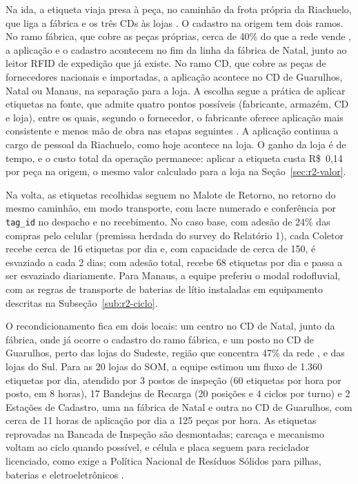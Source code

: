 Na ida, a etiqueta viaja presa à peça, no caminhão da frota própria da Riachuelo, que liga a fábrica e os três CDs às lojas \cite{bloomberglinea2026riachuelo,exame2025bolsa,folhape2023guararapes}. O cadastro na origem tem dois ramos. No ramo fábrica, que cobre as peças próprias, cerca de 40\% do que a rede vende \cite{bloomberglinea2026riachuelo}, a aplicação e o cadastro acontecem no fim da linha da fábrica de Natal, junto ao leitor RFID de expedição que já existe. No ramo CD, que cobre as peças de fornecedores nacionais e importadas, a aplicação acontece no CD de Guarulhos, Natal ou Manaus, na separação para a loja. A escolha segue a prática de aplicar etiquetas na fonte, que admite quatro pontos possíveis (fabricante, armazém, CD e loja), entre os quais, segundo o fornecedor, o fabricante oferece aplicação mais consistente e menos mão de obra nas etapas seguintes \cite{sensormatic2025sourcetagging}. A aplicação continua a cargo de pessoal da Riachuelo, como hoje acontece na loja. O ganho da loja é de tempo, e o custo total da operação permanece: aplicar a etiqueta custa R\$~0,14 por peça na origem, o mesmo valor calculado para a loja na Seção~\ref{sec:r2-valor}.

Na volta, as etiquetas recolhidas seguem no Malote de Retorno, no retorno do mesmo caminhão, em modo transporte, com lacre numerado e conferência por \texttt{tag\_id} no despacho e no recebimento. No caso base, com adesão de 24\% das compras pelo celular (premissa herdada do survey do Relatório 1), cada Coletor recebe cerca de 16 etiquetas por dia e, com capacidade de cerca de 150, é esvaziado a cada 2 dias; com adesão total, recebe 68 etiquetas por dia e passa a ser esvaziado diariamente. Para Manaus, a equipe preferiu o modal rodofluvial, com as regras de transporte de baterias de lítio instaladas em equipamento descritas na Subseção~\ref{sub:r2-ciclo}.

O recondicionamento fica em dois locais: um centro no CD de Natal, junto da fábrica, onde já ocorre o cadastro do ramo fábrica, e um posto no CD de Guarulhos, perto das lojas do Sudeste, região que concentra 47\% da rede \cite{btg2025guararapes}, e das lojas do Sul. Para as 20 lojas do SOM, a equipe estimou um fluxo de 1.360 etiquetas por dia, atendido por 3 postos de inspeção (60 etiquetas por hora por posto, em 8 horas), 17 Bandejas de Recarga (20 posições e 4 ciclos por turno) e 2 Estações de Cadastro, uma na fábrica de Natal e outra no CD de Guarulhos, com cerca de 11 horas de aplicação por dia a 125 peças por hora. As etiquetas reprovadas na Bancada de Inspeção são desmontadas; carcaça e mecanismo voltam ao ciclo quando possível, e célula e placa seguem para reciclador licenciado, como exige a Política Nacional de Resíduos Sólidos para pilhas, baterias e eletroeletrônicos \cite{brasil2010pnrs}.

